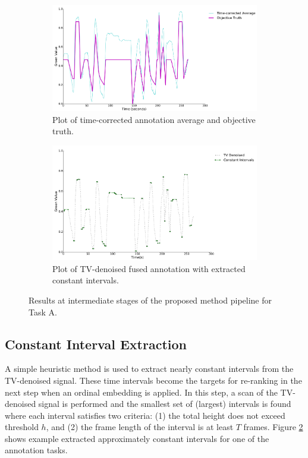 \documentclass[times,twocolumn,final,authoryear]{elsarticle}
\begin{document}
\begin{figure}
	\centering
	\begin{subfigure}{0.49\textwidth}
	\includegraphics[width=\textwidth]{images/average_and_objective}
	\caption{Plot of time-corrected annotation average and objective truth.}
	\label{fig:average_and_objective}
	\end{subfigure}
	\begin{subfigure}{0.49\textwidth}
	\includegraphics[width=\textwidth]{images/tv_and_intervals}
	\caption{Plot of TV-denoised fused annotation with extracted constant intervals.}
	\label{fig:tv_and_intervals}
	\end{subfigure}
	\caption{Results at intermediate stages of the proposed method pipeline for Task A.}
	\label{fig:average_and_objective_and_tv}
\end{figure}

\subsection{Constant Interval Extraction}
A simple heuristic method is used to extract nearly constant intervals from the TV-denoised signal.  These time intervals become the targets for re-ranking in the next step when an ordinal embedding is applied.  In this step, a scan of the TV-denoised signal is performed and the smallest set of (largest) intervals is found where each interval satisfies two criteria: (1) the total height does not exceed threshold $h$, and (2) the frame length of the interval is at least $T$ frames.  Figure \ref{fig:tv_and_intervals} shows example extracted approximately constant intervals for one of the annotation tasks.
\end{document}
